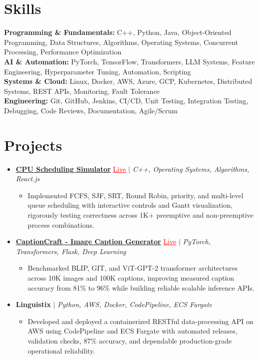 \documentclass[letterpaper,10pt]{article}
\newcommand{\itemTail}{\vspace{-5pt}}
\newcommand{\sectionGap}{\vspace{-8pt}}
\newcommand{\projGap}{\vspace{3pt}}
\newcommand{\resumeItem}[1]{\item\small{{#1 \itemTail}}}
\newcommand{\resumeProjectHeading}[1]{\item \small #1 \vspace{-2pt}}
\newcommand{\resumeProjectLink}[2]{\href{#1}{\textcolor{red}{\underline{#2}}}}
\newcommand{\resumeSubHeadingListStart}{\begin{itemize}[leftmargin=0.0in, label={}]}
\newcommand{\resumeSubHeadingListEnd}{\end{itemize}}
\newcommand{\resumeProjItemListStart}{\begin{itemize}[leftmargin=0.15in,label=\textbullet,itemsep=3pt,topsep=0pt,parsep=0pt,partopsep=0pt]}
\newcommand{\resumeProjItemListEnd}{\end{itemize}\vspace{-4pt}}
\begin{document}
\section{Skills}
\begin{itemize}[leftmargin=0.15in, label={}]
\small{\item{
\textbf{Programming \& Fundamentals:} C++, Python, Java, Object-Oriented Programming, Data Structures, Algorithms, Operating Systems, Concurrent Processing, Performance Optimization \\
\textbf{AI \& Automation:} PyTorch, TensorFlow, Transformers, LLM Systems, Feature Engineering, Hyperparameter Tuning, Automation, Scripting \\
\textbf{Systems \& Cloud:} Linux, Docker, AWS, Azure, GCP, Kubernetes, Distributed Systems, REST APIs, Monitoring, Fault Tolerance \\
\textbf{Engineering:} Git, GitHub, Jenkins, CI/CD, Unit Testing, Integration Testing, Debugging, Code Reviews, Documentation, Agile/Scrum
}}
\end{itemize}
\sectionGap
\section{Projects}
\resumeSubHeadingListStart
\vspace{-2pt}
\resumeProjectHeading{\href{https://cpu-scheduler-amber.vercel.app/}{\textbf{CPU Scheduling Simulator}} \resumeProjectLink{https://cpu-scheduler-amber.vercel.app/}{Live} $|$ \emph{C++, Operating Systems, Algorithms, React.js}}
\resumeProjItemListStart
\resumeItem{Implemented FCFS, SJF, SRT, Round Robin, priority, and multi-level queue scheduling with interactive controls and Gantt visualization, rigorously testing correctness across 1K+ preemptive and non-preemptive process combinations.}
\resumeProjItemListEnd
\projGap
\resumeProjectHeading{\href{https://imagecaptiongenerator.com/}{\textbf{CaptionCraft - Image Caption Generator}} \resumeProjectLink{https://imagecaptiongenerator.com/}{Live} $|$ \emph{PyTorch, Transformers, Flask, Deep Learning}}
\resumeProjItemListStart
\resumeItem{Benchmarked BLIP, GIT, and ViT-GPT-2 transformer architectures across 10K images and 100K captions, improving measured caption accuracy from 81\% to 96\% while building reliable scalable inference APIs.}
\resumeProjItemListEnd
\projGap
\resumeProjectHeading{\textbf{Linguistix} $|$ \emph{Python, AWS, Docker, CodePipeline, ECS Fargate}}
\resumeProjItemListStart
\resumeItem{Developed and deployed a containerized RESTful data-processing API on AWS using CodePipeline and ECS Fargate with automated releases, validation checks, 87\% accuracy, and dependable production-grade operational reliability.}
\resumeProjItemListEnd
\resumeSubHeadingListEnd
\end{document}
